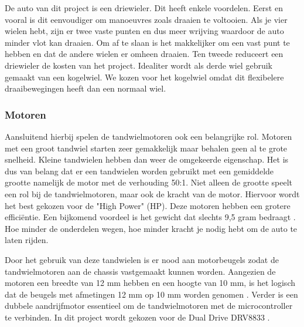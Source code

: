 \documentclass[a4paper,twoside,kulak]{kulakreport} %
\begin{document}
De auto van dit project is een driewieler. Dit heeft enkele voordelen. Eerst en vooral is dit eenvoudiger om manoeuvres zoals draaien te voltooien. Als je vier wielen hebt, zijn er twee vaste punten en dus meer wrijving waardoor de auto minder vlot kan draaien. Om af te slaan is het makkelijker om een vast punt te hebben en dat de andere wielen er omheen draaien.%
Ten tweede reduceert een driewieler de kosten van het project. Idealiter wordt als derde wiel gebruik gemaakt van een kogelwiel. We kozen voor het kogelwiel omdat dit flexibelere draaibewegingen heeft dan een normaal wiel. 
\label{Wielen}
~

\subsubsection{Motoren}
Aansluitend hierbij spelen de tandwielmotoren ook een belangrijke rol. Motoren met een groot tandwiel starten zeer gemakkelijk maar behalen geen al te grote snelheid. Kleine tandwielen hebben dan weer de omgekeerde eigenschap. Het is dus van belang dat er een tandwielen worden gebruikt met een gemiddelde grootte namelijk de motor met de verhouding 50:1. Niet alleen de grootte speelt een rol bij de tandwielmotoren, maar ook de kracht van de motor. Hiervoor wordt het best gekozen voor de "High Power" (HP). Deze motoren hebben een grotere efficiëntie. Een bijkomend voordeel is het gewicht dat slechts 9,5 gram bedraagt \cite{MicroMetalGearMotor50:1HP}. %
Hoe minder de onderdelen wegen, hoe minder kracht je nodig hebt om de auto te laten rijden. 

Door het gebruik van deze tandwielen is er nood aan motorbeugels zodat de tandwielmotoren aan de chassis  vastgemaakt kunnen worden. Aangezien de motoren een breedte van 12 mm hebben en een hoogte van 10 mm, is het logisch dat de beugels met afmetingen 12 mm op 10 mm worden genomen \cite{MicroMetalGearMotorBeugel}.
Verder is een dubbele aandrijfmotor essentieel om de tandwielmotoren met de microcontroller te verbinden. In dit project wordt gekozen voor de Dual Drive DRV8833 \cite{DualDriveDRV8833}. 
\label{Motoren}

~
\end{document}
